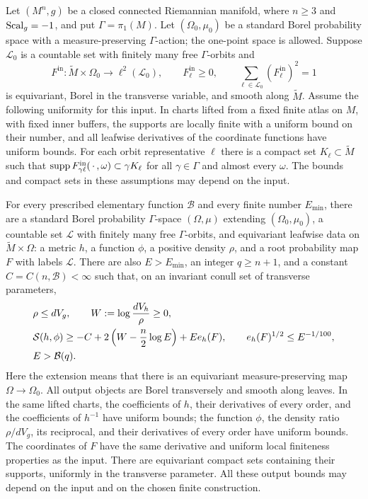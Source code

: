 \begin{theorem}\label{thm:entropy}
Let \((M^n,g)\) be a closed connected Riemannian manifold, where \(n\geq3\)
and \(\operatorname{Scal}_g=-1\), and put \(\Gamma=\pi_1(M)\).  Let
\((\Omega_0,\mu_0)\) be a standard Borel probability space with a
measure-preserving \(\Gamma\)-action; the one-point space is allowed.
Suppose \(\mathcal L_0\) is a countable set with finitely many free
\(\Gamma\)-orbits and
\[
 F^{\mathrm{in}}:\widetilde M\times\Omega_0\longrightarrow
       \ell^2(\mathcal L_0),\qquad
 F^{\mathrm{in}}_\ell\geq0,\qquad
 \sum_{\ell\in\mathcal L_0}(F^{\mathrm{in}}_\ell)^2=1
\]
is equivariant, Borel in the transverse variable, and smooth along
\(\widetilde M\).  Assume the following uniformity for this input.  In
charts lifted from a fixed finite atlas on \(M\), with fixed inner buffers,
the supports are locally finite with a uniform bound on their number,
and all leafwise derivatives of the coordinate functions have uniform
bounds.  For each orbit representative \(\ell\) there is a compact set
\(K_\ell\subset\widetilde M\) such that
\(\operatorname{supp} F^{\mathrm{in}}_{\gamma\ell}(\,\cdot\,,\omega)
\subset\gamma K_\ell\) for all \(\gamma\in\Gamma\) and almost every
\(\omega\).  The bounds and compact sets in these assumptions may depend
on the input.

For every prescribed elementary function \(\mathcal B\) and every finite
number \(E_{\min}\), there are a standard Borel probability
\(\Gamma\)-space \((\Omega,\mu)\) extending \((\Omega_0,\mu_0)\), a
countable set \(\mathcal L\) with finitely many free \(\Gamma\)-orbits, and
equivariant leafwise data on \(\widetilde M\times\Omega\): a metric \(h\),
a function \(\phi\), a positive density \(\rho\), and a root probability
map \(F\) with labels \(\mathcal L\).  There are also \(E>E_{\min}\), an
integer \(q\geq n+1\), and a constant \(C=C(n,\mathcal B)<\infty\) such
that, on an invariant conull set of transverse parameters,
\begin{equation}\label{eq:entropy-contract}
\begin{split}
 &\rho\leq dV_g,\qquad
 W:=\log\frac{dV_h}{\rho}\geq0,\\
 &\mathcal S(h,\phi)\geq
       -C+2\left(W-\frac n2\log E\right)+E e_h(F),
       \qquad e_h(F)^{1/2}\leq E^{-1/100},\\
 &E>\mathcal B(q).
\end{split}
\end{equation}
Here the extension means that there is an equivariant measure-preserving
map \(\Omega\to\Omega_0\).  All output objects are Borel transversely and
smooth along leaves.  In the same lifted charts, the coefficients of
\(h\), their derivatives of every order, and the coefficients of \(h^{-1}\)
have uniform bounds; the function \(\phi\), the density ratio
\(\rho/dV_g\), its reciprocal, and their derivatives of every order have
uniform bounds.  The coordinates of \(F\) have the same derivative and
uniform local finiteness properties as the input.  There are equivariant
compact sets containing their supports, uniformly in the transverse
parameter.  All these output bounds may depend on the input and on the
chosen finite construction.


\end{theorem}
